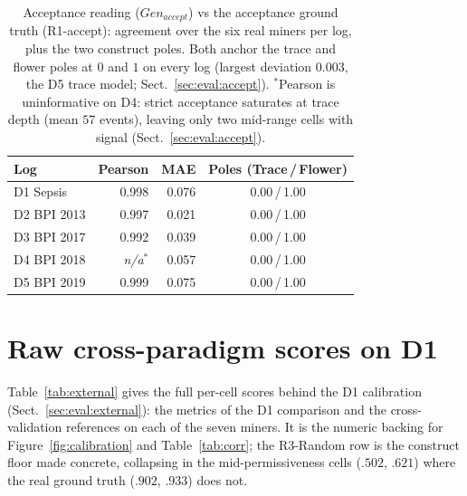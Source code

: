 \documentclass[runningheads]{llncs}
\newcommand{\chg}[1]{\textcolor{chgblue}{#1}}
\newcommand{\genaccept}{\ensuremath{\mathit{Gen}_{\mathit{accept}}}}
\begin{document}
\begin{table}[h]
\centering
\caption{Acceptance reading (\genaccept) vs the acceptance ground truth (R1-accept): agreement over the six real miners per log, plus the two construct poles. Both anchor the trace and flower poles at $0$ and $1$ on every log (largest deviation $0.003$, the D5 trace model; Sect.~\ref{sec:eval:accept}). $^{*}$Pearson is uninformative on D4: strict acceptance saturates at trace depth (mean $57$ events), leaving only two mid-range cells with signal (Sect.~\ref{sec:eval:accept}).}
\label{tab:accept-scale}
\setlength{\tabcolsep}{6pt}
\footnotesize
\begin{tabular}{@{}lrrc@{}}
\toprule
Log & Pearson & MAE & Poles (Trace\,/\,Flower) \\
\midrule
D1 Sepsis   & 0.998 & 0.076 & 0.00\,/\,1.00 \\
D2 BPI 2013 & 0.997 & 0.021 & 0.00\,/\,1.00 \\
D3 BPI 2017 & 0.992 & 0.039 & 0.00\,/\,1.00 \\
D4 BPI 2018 & \emph{n/a}$^{*}$ & 0.057 & 0.00\,/\,1.00 \\
D5 BPI 2019 & 0.999 & 0.075 & 0.00\,/\,1.00 \\
\bottomrule
\end{tabular}
\end{table}

\section{Raw cross-paradigm scores on D1}
\label{sec:appendix:external}
\chg{Table~\ref{tab:external} gives the full per-cell scores behind the D1 calibration (Sect.~\ref{sec:eval:external}): the metrics of the D1 comparison and the cross-validation references on each of the seven miners. It is the numeric backing for Figure~\ref{fig:calibration} and Table~\ref{tab:corr}; the R3-Random row is the construct floor made concrete, collapsing in the mid-permissiveness cells ($.502$, $.621$) where the real ground truth ($.902$, $.933$) does not.}
\end{document}
